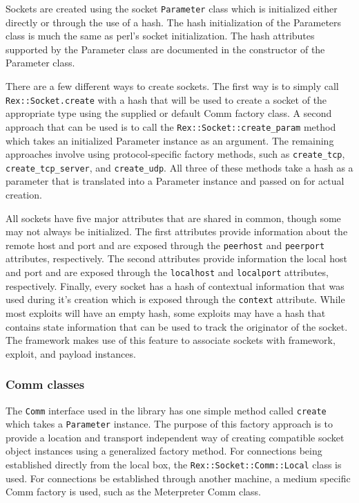 \documentclass{report}
\begin{document}
\par
Sockets are created using the socket \texttt{Parameter} class which
is initialized either directly or through the use of a hash.  The
hash initialization of the Parameters class is much the same as
perl's socket initialization.  The hash attributes supported by the
Parameter class are documented in the constructor of the Parameter
class.

\par
There are a few different ways to create sockets.  The first way is
to simply call \texttt{Rex::Socket.create} with a hash that will be
used to create a socket of the appropriate type using the supplied
or default Comm factory class.  A second approach that can be used
is to call the \texttt{Rex::Socket::create\_param} method which
takes an initialized Parameter instance as an argument.  The
remaining approaches involve using protocol-specific factory
methods, such as \texttt{create\_tcp}, \texttt{create\_tcp\_server},
and \texttt{create\_udp}.  All three of these methods take a hash as
a parameter that is translated into a Parameter instance and passed
on for actual creation.

\par
All sockets have five major attributes that are shared in common,
though some may not always be initialized.  The first attributes
provide information about the remote host and port and are exposed
through the \texttt{peerhost} and \texttt{peerport} attributes,
respectively.  The second attributes provide information the local
host and port and are exposed through the \texttt{localhost} and
\texttt{localport} attributes, respectively.  Finally, every socket
has a hash of contextual information that was used during it's
creation which is exposed through the \texttt{context} attribute.
While most exploits will have an empty hash, some exploits may have
a hash that contains state information that can be used to track the
originator of the socket.  The framework makes use of this feature
to associate sockets with framework, exploit, and payload instances.

            \subsubsection{Comm classes}

\par
The \texttt{Comm} interface used in the library has one simple
method called \texttt{create} which takes a \texttt{Parameter}
instance.  The purpose of this factory approach is to provide a
location and transport independent way of creating compatible socket
object instances using a generalized factory method.  For
connections being established directly from the local box, the
\texttt{Rex::Socket::Comm::Local} class is used.  For connections be
established through another machine, a medium specific Comm factory
is used, such as the Meterpreter Comm class.
\end{document}

